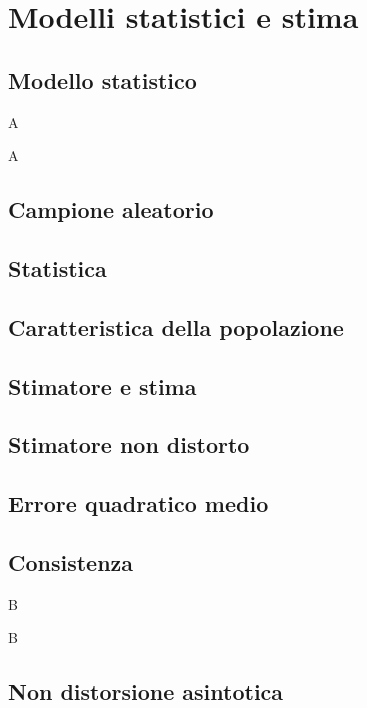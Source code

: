
\chapter{Modelli statistici e stima}
    \section{Modello statistico}
        \begin{defn}[Parametrico]
            A
        \end{defn}
        \begin{defn}
            A
        \end{defn}
    \section{Campione aleatorio}
    \section{Statistica}
    \section{Caratteristica della popolazione}
    \section{Stimatore e stima}
    \section{Stimatore non distorto}
    \section{Errore quadratico medio}
    \section{Consistenza}
        \begin{defn}[Semplice]
            B
        \end{defn}
        \begin{defn}
            B
        \end{defn}
    \section{Non distorsione asintotica}
